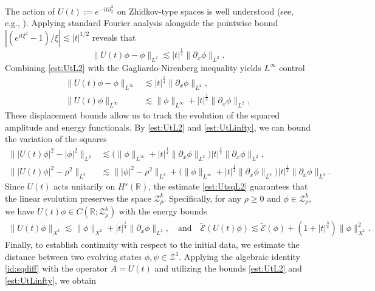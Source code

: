 \documentclass{amsart}
\numberwithin{equation}{section}
\newcommand{\R}{\mathbb{R}}
\begin{document}
The action of $U(t):=e^{-it\partial_x^2}$ on Zhidkov-type spaces is well understood (see, e.g., \cite{Gerard,Chen}). Applying standard Fourier analysis alongside the pointwise bound $|(e^{it\xi^2}-1)/\xi|\lesssim |t|^{1/2}$ reveals that
\begin{equation}\label{est:UtL2}
\| U(t)\phi -\phi\|_{L^2}\lesssim |t|^{\frac12}\| \partial_x\phi\|_{L^2}.
\end{equation}
Combining \eqref{est:UtL2} with the Gagliardo-Nirenberg inequality yields $L^\infty$ control 
\begin{equation}\label{est:UtLinfty}
\begin{aligned}
\| U(t)\phi-\phi\|_{L^\infty}&\lesssim |t|^{\frac14}\| \partial_x\phi\|_{L^2},\\
\| U(t)\phi\|_{L^\infty}&\lesssim \| \phi\|_{L^\infty}+|t|^{\frac14}\|\partial_x\phi\|_{L^2},
\end{aligned}
\end{equation}
These displacement bounds allow us to track the evolution of the squared amplitude and energy functionals. By \eqref{est:UtL2} and \eqref{est:UtLinfty}, we can bound the variation of the squares
\begin{equation}\label{est:UtsqL2}
\begin{aligned}
\big\| |U(t)\phi|^2-|\phi|^2\big\|_{L^2}&\lesssim \Big( \| \phi\|_{L^\infty}+|t|^{\frac14}\| \partial_x\phi\|_{L^2}\Big) |t|^{\frac12}\| \partial_x\phi\|_{L^2}, \\
\big\| |U(t)\phi|^2-\rho^2\big\|_{L^2}&\lesssim \big\| |\phi|^2-\rho^2\big\|_{L^2}+\Big( \| \phi\|_{L^\infty}+|t|^{\frac14}\| \partial_x\phi\|_{L^2}\Big) |t|^{\frac12}\| \partial_x\phi\|_{L^2}.
\end{aligned}
\end{equation}
Since $U(t)$ acts unitarily on $H^s(\R)$, the estimate \eqref{est:UtsqL2} guarantees that the linear evolution preserves the space $\mathcal{Z}^k_\rho$. Specifically, for any $\rho \geq 0$ and $\phi \in \mathcal{Z}^k_\rho$, we have $U(t)\phi \in C(\R;\mathcal{Z}^k_\rho)$ with the energy bounds
\begin{equation}\label{est:UtEk}
\begin{aligned}  
\| U(t)\phi\|_{X^k}{}\lesssim \| \phi\|_{X^k}+|t|^{\frac14}\| \partial_x\phi\|_{L^2}, \quad \text{and}\quad
\widetilde{\mathcal{E}}(U(t)\phi){}\lesssim \widetilde{\mathcal{E}}(\phi)+(1+|t|^{\frac34})\| \phi\|_{X^1}^2.
\end{aligned} 
\end{equation}
Finally, to establish continuity with respect to the initial data, we estimate the distance between two evolving states $\phi, \psi \in \mathcal{Z}^{1}$. Applying the algebraic identity \eqref{id:sqdiff} with the operator $A = U(t)$ and utilizing the bounds \eqref{est:UtL2} and \eqref{est:UtLinfty}, we obtain
\end{document}
